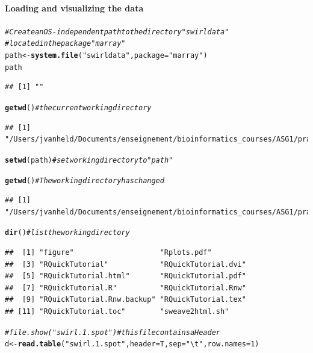 \documentclass[10pt]{article}\usepackage[]{graphicx}\usepackage[]{color}
\makeatletter
\newcommand{\hlnum}[1]{\textcolor[rgb]{0.686,0.059,0.569}{#1}}%
\newcommand{\hlstr}[1]{\textcolor[rgb]{0.192,0.494,0.8}{#1}}%
\newcommand{\hlcom}[1]{\textcolor[rgb]{0.678,0.584,0.686}{\textit{#1}}}%
\newcommand{\hlstd}[1]{\textcolor[rgb]{0.345,0.345,0.345}{#1}}%
\newcommand{\hlkwb}[1]{\textcolor[rgb]{0.69,0.353,0.396}{#1}}%
\newcommand{\hlkwc}[1]{\textcolor[rgb]{0.333,0.667,0.333}{#1}}%
\newcommand{\hlkwd}[1]{\textcolor[rgb]{0.737,0.353,0.396}{\textbf{#1}}}%
\newenvironment{kframe}{%
 \def\at@end@of@kframe{}%
 \ifinner\ifhmode%
  \def\at@end@of@kframe{\end{minipage}}%
  \begin{minipage}{\columnwidth}%
 \fi\fi%
 \def\FrameCommand##1{\hskip\@totalleftmargin \hskip-\fboxsep
 \colorbox{shadecolor}{##1}\hskip-\fboxsep
     \hskip-\linewidth \hskip-\@totalleftmargin \hskip\columnwidth}%
 \MakeFramed {\advance\hsize-\width
   \@totalleftmargin\z@ \linewidth\hsize
   \@setminipage}}%
 {\par\unskip\endMakeFramed%
 \at@end@of@kframe}
\newenvironment{knitrout}{}{} %
\makeatother
\begin{document}
\paragraph{Loading and visualizing the data}
\begin{knitrout}
\color{fgcolor}\begin{kframe}
\begin{alltt}
\hlcom{# Create an OS-independent path to the directory "swirldata"}
\hlcom{# located in the package "marray"}
\hlstd{path} \hlkwb{<-} \hlkwd{system.file}\hlstd{(}\hlstr{"swirldata"}\hlstd{,} \hlkwc{package} \hlstd{=} \hlstr{"marray"}\hlstd{)}
\hlstd{path}
\end{alltt}
\begin{verbatim}
## [1] ""
\end{verbatim}
\begin{alltt}
\hlkwd{getwd}\hlstd{()}                   \hlcom{# the current working directory}
\end{alltt}
\begin{verbatim}
## [1] "/Users/jvanheld/Documents/enseignement/bioinformatics_courses/ASG1/practicals/r_intro_en"
\end{verbatim}
\begin{alltt}
\hlkwd{setwd}\hlstd{(path)}               \hlcom{# set working directory to "path"}
\end{alltt}


{\ttfamily\noindent\bfseries\color{errorcolor}{\#\# Error in setwd(path): cannot change working directory}}\begin{alltt}
\hlkwd{getwd}\hlstd{()}                   \hlcom{# The working directory has changed}
\end{alltt}
\begin{verbatim}
## [1] "/Users/jvanheld/Documents/enseignement/bioinformatics_courses/ASG1/practicals/r_intro_en"
\end{verbatim}
\begin{alltt}
\hlkwd{dir}\hlstd{()}                     \hlcom{# list the working directory}
\end{alltt}
\begin{verbatim}
##  [1] "figure"                    "Rplots.pdf"               
##  [3] "RQuickTutorial"            "RQuickTutorial.dvi"       
##  [5] "RQuickTutorial.html"       "RQuickTutorial.pdf"       
##  [7] "RQuickTutorial.R"          "RQuickTutorial.Rnw"       
##  [9] "RQuickTutorial.Rnw.backup" "RQuickTutorial.tex"       
## [11] "RQuickTutorial.toc"        "sweave2html.sh"
\end{verbatim}
\begin{alltt}
\hlcom{#file.show("swirl.1.spot") # this file contains a Header}
\hlstd{d} \hlkwb{<-} \hlkwd{read.table}\hlstd{(}\hlstr{"swirl.1.spot"}\hlstd{,} \hlkwc{header}\hlstd{=T,} \hlkwc{sep}\hlstd{=}\hlstr{"\textbackslash{}t"}\hlstd{,} \hlkwc{row.names}\hlstd{=}\hlnum{1}\hlstd{)}
\end{alltt}



\end{kframe}
\end{knitrout}
\end{document}
